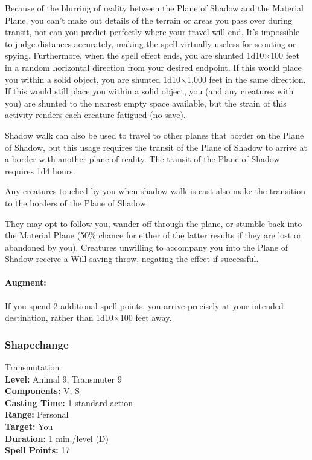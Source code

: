 Because of the blurring of reality between the Plane of Shadow and the Material Plane, 
you can't make out details of the terrain or areas you pass over during transit, nor can you predict perfectly where your travel will end. 
It's impossible to judge distances accurately, making the spell virtually useless for scouting or spying. 
Furthermore, when the spell effect ends, you are shunted 1d10$\times$100 feet in a random horizontal direction from your desired endpoint. 
If this would place you within a solid object, you are shunted 1d10$\times$1,000 feet in the same direction. 
If this would still place you within a solid object, you (and any creatures with you) are shunted to the nearest empty space available, 
but the strain of this activity renders each creature fatigued (no save).

Shadow walk can also be used to travel to other planes that border on the Plane of Shadow, 
but this usage requires the transit of the Plane of Shadow to arrive at a border with another plane of reality. The transit of the Plane of Shadow requires 1d4 hours.

Any creatures touched by you when shadow walk is cast also make the transition to the borders of the Plane of Shadow.

They may opt to follow you, wander off through the plane, or stumble back into the Material Plane 
(50\% chance for either of the latter results if they are lost or abandoned by you). 
Creatures unwilling to accompany you into the Plane of Shadow receive a Will saving throw, negating the effect if successful. 

\paragraph{Augment:} If you spend 2 additional spell points, you arrive precisely at your intended destination, rather than 1d10$\times$100 feet away.

\subsubsection{Shapechange}
\label{Spell:Shapechange}
Transmutation
\\ \textbf{Level:} Animal 9, Transmuter 9
\\ \textbf{Components:} V, S
\\ \textbf{Casting Time:} 1 standard action
\\ \textbf{Range:} Personal
\\ \textbf{Target:} You
\\ \textbf{Duration:} 1 min./level (D)
\\ \textbf{Spell Points:} 17

